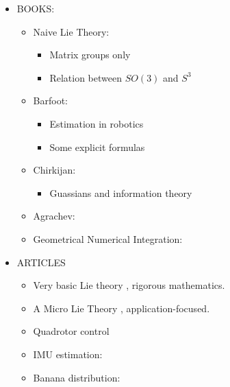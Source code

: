 \begin{itemize}
  \item BOOKS:
        \begin{itemize}
          \item Naive Lie Theory: \cite{stillwell_naive_2008}
                \begin{itemize}
                  \item Matrix groups only
                  \item Relation between $SO(3)$ and $S^3$
                \end{itemize}
          \item Barfoot: \cite{barfoot_state_2017}
                \begin{itemize}
                  \item Estimation in robotics
                  \item Some explicit formulas
                \end{itemize}
          \item Chirkijan: \cite{chirikjian_stochastic_2012, chirikjian_stochastic_2009}
                \begin{itemize}
                  \item Guassians and information theory
                \end{itemize}
          \item Agrachev: \cite{agrachev_control_2004}
          \item Geometrical Numerical Integration: \cite{blanes_concise_2016}
        \end{itemize}

  \item ARTICLES
        \begin{itemize}
          \item Very basic Lie theory \cite{howe_very_1983}, rigorous mathematics.
          \item A Micro Lie Theory \cite{sola_micro_2018}, application-focused.
          \item Quadrotor control \cite{Lee2015}
          \item IMU estimation: \cite{hua_implementation_2014, mahony_nonlinear_2008}
          \item Banana distribution: \cite{wheeler_relative_2018}
        \end{itemize}
\end{itemize}
